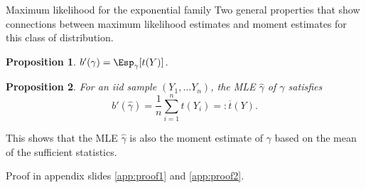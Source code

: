 \documentclass[compress,10pt]{beamer}
\newtheorem{proposition}{Proposition}
\begin{document}
\begin{frame}{Maximum likelihood for the exponential family}
\label{Prop:ExpFam-bprime}
Two general properties that show connections between maximum likelihood estimates and moment estimates for this class of distribution. 

\begin{proposition} 
$b'(\gamma) = \Esp_\gamma[t(Y)]$.
\end{proposition}

\begin{proposition}
  For an iid sample $(Y_1, \dots Y_n)$, the MLE $\widehat{\gamma}$ of $\gamma$ satisfies 
  \[
  b' (\widehat{\gamma}) = \frac{1}{n}\sum_{i=1}^n t(Y_i) =: \overline{t}(Y).
  \] 
\end{proposition}
This shows that the MLE $\widehat{\gamma}$ is also the moment estimate of $\gamma$ based on the mean of the sufficient statistics.

{\scriptsize 
Proof in appendix slides \ref{app:proof1} and  \ref{app:proof2}.
}
\end{frame}
\end{document}
